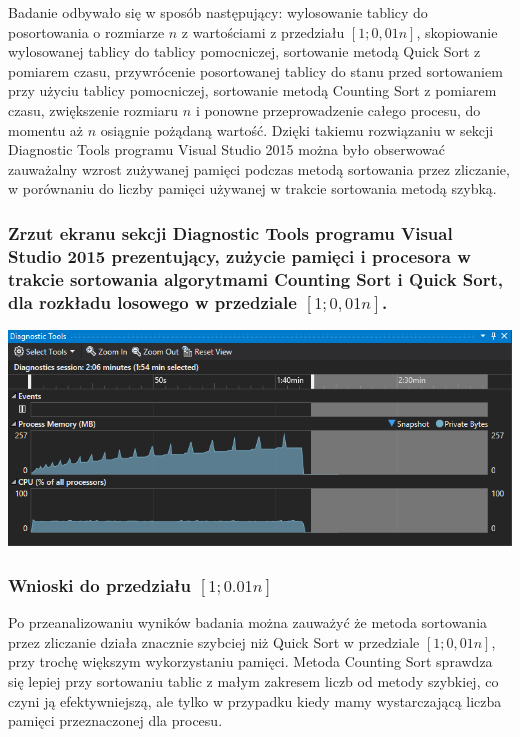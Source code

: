 \documentclass[polish,polish,a4paper]{article}
\begin{document}
\begin{spacing}{1.5}
Badanie odbywało się w sposób następujący: wylosowanie tablicy do posortowania o rozmiarze $n$ z wartościami z przedziału $[1;0,01n]$, skopiowanie wylosowanej tablicy do tablicy pomocniczej, sortowanie metodą Quick Sort z pomiarem czasu, przywrócenie posortowanej tablicy do stanu przed sortowaniem przy użyciu tablicy pomocniczej, sortowanie metodą Counting Sort z pomiarem czasu, zwiększenie rozmiaru $n$ i ponowne przeprowadzenie całego procesu, do momentu aż $n$ osiągnie pożądaną wartość.	Dzięki takiemu rozwiązaniu w sekcji Diagnostic Tools programu Visual Studio 2015 można było obserwować zauważalny  wzrost zużywanej pamięci podczas metodą sortowania przez zliczanie, w porównaniu do liczby pamięci używanej w trakcie sortowania metodą szybką.

\subsubsection*{Zrzut ekranu sekcji Diagnostic Tools programu Visual Studio 2015 prezentujący, zużycie pamięci i procesora w trakcie sortowania algorytmami Counting Sort i  Quick Sort, dla rozkładu losowego w przedziale $[1;0,01n]$.}

	\begin{minipage}[H]{\textwidth}
	\begin{center}
		\includegraphics[scale=0.85]{zad4pamiec001n.png}
		\label{fig:zad4pamiec001n}
	\end{center}
	\end{minipage}

\subsubsection{Wnioski do przedziału $[1;0.01n]$}

Po przeanalizowaniu wyników badania można zauważyć że metoda sortowania przez zliczanie działa znacznie szybciej niż Quick Sort w przedziale $[1;0,01n]$, przy trochę większym wykorzystaniu pamięci. Metoda Counting Sort sprawdza się lepiej przy sortowaniu tablic z małym zakresem liczb od metody szybkiej, co czyni ją efektywniejszą, ale tylko w przypadku kiedy mamy wystarczającą liczba pamięci przeznaczonej dla procesu.


\end{spacing}
\end{document}
